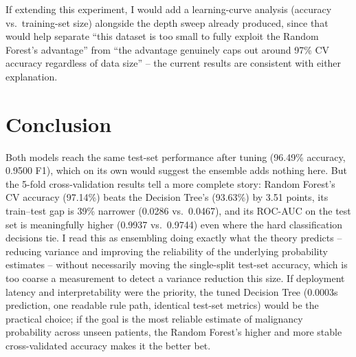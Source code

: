 \documentclass[11pt,a4paper]{article}
\begin{document}
If extending this experiment, I would add a learning-curve analysis (accuracy vs.\ training-set size) alongside the depth sweep already produced, since that would help separate ``this dataset is too small to fully exploit the Random Forest's advantage'' from ``the advantage genuinely caps out around 97\% CV accuracy regardless of data size'' -- the current results are consistent with either explanation.

\section{Conclusion}
Both models reach the same test-set performance after tuning (96.49\% accuracy, 0.9500 F1), which on its own would suggest the ensemble adds nothing here. But the 5-fold cross-validation results tell a more complete story: Random Forest's CV accuracy (97.14\%) beats the Decision Tree's (93.63\%) by 3.51 points, its train--test gap is 39\% narrower (0.0286 vs.\ 0.0467), and its ROC-AUC on the test set is meaningfully higher (0.9937 vs.\ 0.9744) even where the hard classification decisions tie. I read this as ensembling doing exactly what the theory predicts -- reducing variance and improving the reliability of the underlying probability estimates -- without necessarily moving the single-split test-set accuracy, which is too coarse a measurement to detect a variance reduction this size. If deployment latency and interpretability were the priority, the tuned Decision Tree (0.0003s prediction, one readable rule path, identical test-set metrics) would be the practical choice; if the goal is the most reliable estimate of malignancy probability across unseen patients, the Random Forest's higher and more stable cross-validated accuracy makes it the better bet.

\end{document}
